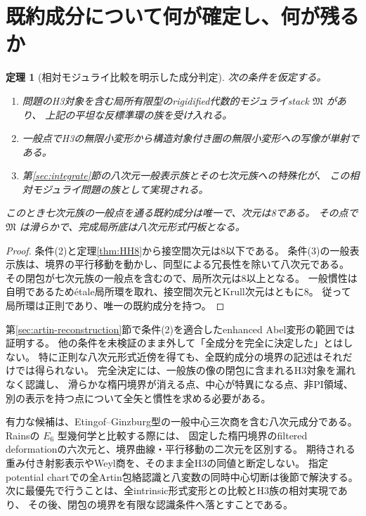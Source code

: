 \documentclass[11pt,a4paper]{ltjsarticle}
\newtheorem{theorem}{定理}[section]
\theoremstyle{definition}\newtheorem{definition}[theorem]{定義}
\theoremstyle{remark}\newtheorem{remark}[theorem]{注意}
\begin{document}
\section{既約成分について何が確定し、何が残るか}\label{sec:component}
\begin{theorem}[相対モジュライ比較を明示した成分判定]\label{thm:conditional-component}
次の条件を仮定する。
\begin{enumerate}
\item 問題のH3対象を含む局所有限型のrigidified代数的モジュライstack $\mathfrak M$ があり、
上記の平坦な反標準環の族を受け入れる。
\item 一般点でH3の無限小変形から構造対象付き圏の無限小変形への写像が単射である。
\item 第\ref{sec:integrate}節の八次元一般表示族とその七次元族への特殊化が、
この相対モジュライ問題の族として実現される。
\end{enumerate}
このとき七次元族の一般点を通る既約成分は唯一で、次元は8である。
その点で $\mathfrak M$ は滑らかで、完成局所底は八次元形式円板となる。
\end{theorem}
\begin{proof}
条件(2)と定理\ref{thm:HH8}から接空間次元は8以下である。
条件(3)の一般表示族は、境界の平行移動を動かし、同型による冗長性を除いて八次元である。
その閉包が七次元族の一般点を含むので、局所次元は8以上となる。
一般慣性は自明であるため\'{e}tale局所環を取れ、接空間次元とKrull次元はともに8。
従って局所環は正則であり、唯一の既約成分を持つ。
\end{proof}

第\ref{sec:artin-reconstruction}節で条件(2)を適合したenhanced Abel変形の範囲では証明する。
他の条件を未検証のまま外して「全成分を完全に決定した」とはしない。
特に正則な八次元形式近傍を得ても、全既約成分の境界の記述はそれだけでは得られない。
完全決定には、一般族の像の閉包に含まれるH3対象を漏れなく認識し、
滑らかな楕円境界が消える点、中心が特異になる点、非PI領域、
別の表示を持つ点について全矢と慣性を求める必要がある。

有力な候補は、Etingof--Ginzburg型の一般中心三次商を含む八次元成分である。
Rainsの $E_6$ 型幾何学と比較する際には、
固定した楕円境界のfiltered deformationの六次元と、境界曲線・平行移動の二次元を区別する。
期待される重み付き射影表示やWeyl商を、そのまま全H3の同値と断定しない。
指定potential chartでの全Artin包絡認識と八変数の同時中心切断は後節で解決する。
次に最優先で行うことは、全intrinsic形式変形との比較とH3族の相対実現であり、
その後、閉包の境界を有限な認識条件へ落とすことである。






\end{document}
